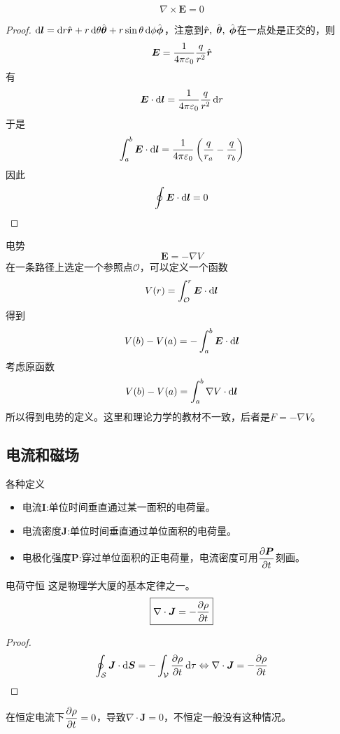 \documentclass{mynote}
\begin{document}
\begin{proposition}
    \[\nabla \times \bm{E} = 0\]
\end{proposition}
\begin{proof}
    $\mathop{}\!\mathrm{d} \boldsymbol{l} = \mathop{}\!\mathrm{d} r \hat{\boldsymbol{r}} + r \mathop{}\!\mathrm{d} \theta \hat{\boldsymbol{\theta}} + r \sin \theta \mathop{}\!\mathrm{d} \phi \hat{\boldsymbol{\phi}}$，注意到$\hat{\boldsymbol{r}},\; \hat{\boldsymbol{\theta}} ,\; \hat{\boldsymbol{\phi}}$在一点处是正交的，则
    \[
    \boldsymbol{E} = \frac{1}{4\pi \varepsilon_0} \frac{q}{r^2} \hat{\boldsymbol{r}}    
    \]
    有
    \[
    \boldsymbol{E} \cdot \mathop{}\!\mathrm{d} \boldsymbol{l} = \frac{1}{4\pi \varepsilon_0} \frac{q}{r^2} \mathop{}\!\mathrm{d} r    
    \]
    于是
    \[
    \int_a^b \boldsymbol{E} \cdot \mathop{}\!\mathrm{d} \boldsymbol{l} = \frac{1}{4\pi \varepsilon_0} \left( \frac{q}{r_a} - \frac{q}{r_b} \right)    
    \]
    因此
    \[
    \oint \boldsymbol{E} \cdot \mathop{}\!\mathrm{d} \boldsymbol{l} = 0    
    \]
\end{proof}




\begin{define}{电势}
    \[
    \bm{E} = - \nabla V    
    \]
    在一条路径上选定一个参照点$\mathcal{O}$，可以定义一个函数
    \[
    V(r) = \int^r_{\mathcal{O}} \boldsymbol{E} \cdot \mathop{}\!\mathrm{d} \boldsymbol{l}    
    \]
    得到
    \[
    V(b) - V(a) = -\int_a^b \boldsymbol{E} \cdot \mathop{}\!\mathrm{d} \boldsymbol{l}
    \]
    考虑原函数
    \[
    V(b) - V(a) = \int_a^b \nabla V \cdot \mathop{}\!\mathrm{d} \boldsymbol{l}
    \]
    所以得到电势的定义。这里和理论力学的教材不一致，后者是$F = -\nabla V$。
\end{define}





\subsection{电流和磁场}
\begin{define}{0}
    各种定义

    \begin{itemize}
        \item 电流$\bm{I}$:单位时间垂直通过某一面积的电荷量。
        \item 电流密度$\bm{J}$:单位时间垂直通过单位面积的电荷量。
        \item 电极化强度$\bm{P}$:穿过单位面积的正电荷量，电流密度可用$\dfrac{\partial \boldsymbol{P}}{\partial t}$刻画。
    \end{itemize}
\end{define}


\begin{theorem}{电荷守恒}
    这是物理学大厦的基本定律之一。
    \[
    \boxed{
        \nabla \cdot \boldsymbol{J} = -\dfrac{\partial \rho}{\partial t}    
    }    
    \]
\end{theorem}
\begin{proof}
    \[
        \oint_{\mathcal{S}} \boldsymbol{J} \cdot \mathop{}\!\mathrm{d} \boldsymbol{S} = -\int_{\mathcal{V}} \dfrac{\partial \rho}{\partial t} \mathop{}\!\mathrm{d} \tau \Leftrightarrow \nabla \cdot \boldsymbol{J} = -\dfrac{\partial \rho}{\partial t}    
    \]
\end{proof}
在恒定电流下$\dfrac{\partial \rho}{\partial t}=0$，导致$\nabla \cdot \bm{J} = 0$，不恒定一般没有这种情况。
\end{document}
